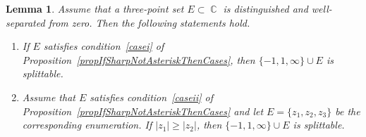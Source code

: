 \documentclass{amsart}
\numberwithin{equation}{section}
\newtheorem{lemma}[theorem]{Lemma}
\theoremstyle{definition}
\theoremstyle{remark}
\DeclareMathOperator{\CC}{\mathbb C}
\begin{document}
	\begin{lemma}\label{lemIfSharpAndImpersandPartialThenSplittable}
		Assume that a three-point set $E \subset \CC$ is distinguished and well-separated from zero. Then the following statements hold.
		\begin{enumerate}[label=(\roman*)]
			\item\label{partialcasesi} If $E$ satisfies condition~\ref{casei} of Proposition~\ref{propIfSharpNotAsteriskThenCases}, then $\{-1,1,\infty\} \cup E$ is splittable.
			\item\label{partialcasesii} Assume that $E$ satisfies condition~\ref{caseii} of Proposition~\ref{propIfSharpNotAsteriskThenCases} and let $E = \{z_1, z_2,z_3\}$ be the corresponding enumeration. If $|z_1| \ge |z_2|$, then $\{-1,1,\infty\} \cup E$ is splittable.
		\end{enumerate}
	\end{lemma}
\end{document}
